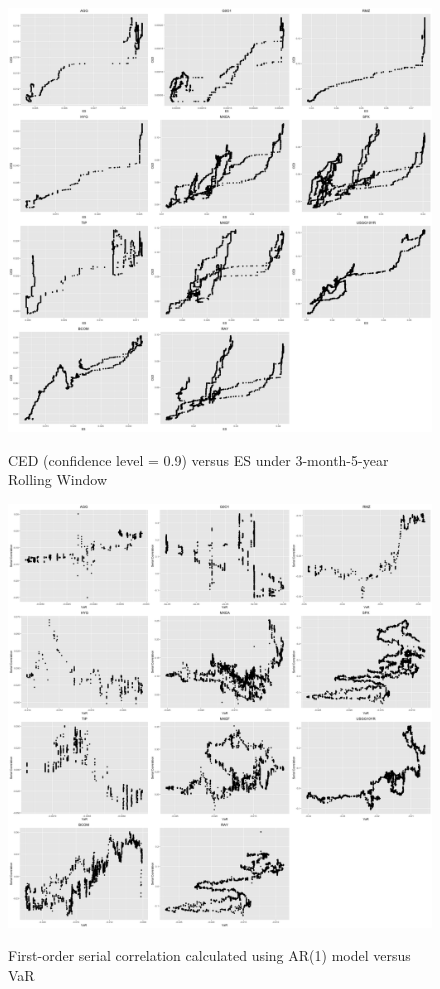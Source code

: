 \documentclass[12pt]{article}
\begin{document}
\begin{figure}[h]
\caption{CED (confidence level = 0.9) versus ES under 3-month-5-year Rolling Window} 
\centering 
\includegraphics[width=15cm]{../results/CED_ES_3mon_5yr5yr}
\label{fig: CED_ES_3mon_5yr5yr}
\end{figure}

\begin{figure}
  \caption{First-order serial correlation calculated using AR(1) model versus VaR}
  \includegraphics[width = 1\textwidth]{../results/SerCol-VaR5yrAR1}
  \label{fig:SerCol-VaR5yrAR1}
\end{figure}
\end{document}
